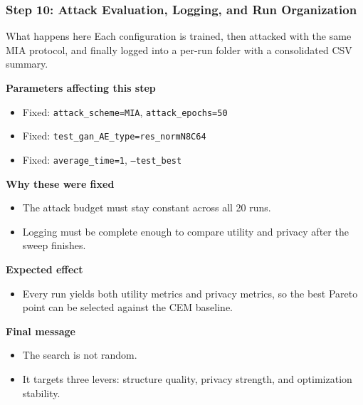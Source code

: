 \documentclass[aspectratio=169]{beamer}
\newcommand{\stepheader}[2]{
    \frametitle{Step #1: #2}
}
\begin{document}
\begin{frame}
    \stepheader{10}{Attack Evaluation, Logging, and Run Organization}
    \scriptsize
    \begin{block}{What happens here}
        Each configuration is trained, then attacked with the same MIA protocol, and finally logged into a per-run folder with a consolidated CSV summary.
    \end{block}
    \textbf{Parameters affecting this step}
    \begin{itemize}
        \item Fixed: \texttt{attack\_scheme=MIA}, \texttt{attack\_epochs=50}
        \item Fixed: \texttt{test\_gan\_AE\_type=res\_normN8C64}
        \item Fixed: \texttt{average\_time=1}, \texttt{--test\_best}
    \end{itemize}
    \textbf{Why these were fixed}
    \begin{itemize}
        \item The attack budget must stay constant across all 20 runs.
        \item Logging must be complete enough to compare utility and privacy after the sweep finishes.
    \end{itemize}
    \textbf{Expected effect}
    \begin{itemize}
        \item Every run yields both utility metrics and privacy metrics, so the best Pareto point can be selected against the CEM baseline.
    \end{itemize}

    \vspace{0.15cm}
    \textbf{Final message}
    \begin{itemize}
        \item The search is not random.
        \item It targets three levers: \alert{structure quality}, \alert{privacy strength}, and \alert{optimization stability}.
    \end{itemize}
\end{frame}
\end{document}

